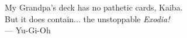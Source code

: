 \thispagestyle{empty}
{}

\vspace*{3cm}

    My Grandpa's deck has no pathetic cards, Kaiba.\\
    But it does contain... the unstoppable \emph{Exodia!}\\
    --- Yu-Gi-Oh   

\medskip

